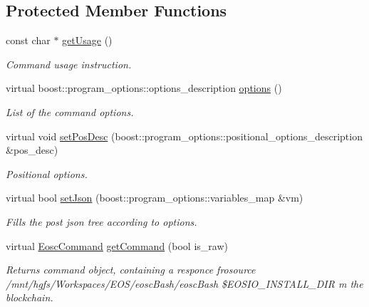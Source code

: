 \subsection*{Protected Member Functions}
\begin{DoxyCompactItemize}
\item 
const char $\ast$ \hyperlink{classtokenika_1_1eosc_1_1_get_block_options_ab0b7572223d35a3232630b9eef51b9cb}{get\+Usage} ()
\begin{DoxyCompactList}\small\item\em Command \textquotesingle{}usage\textquotesingle{} instruction. \end{DoxyCompactList}\item 
virtual boost\+::program\+\_\+options\+::options\+\_\+description \hyperlink{classtokenika_1_1eosc_1_1_get_block_options_a6e8c1a240e5a529c093e0053f12e9ee5}{options} ()
\begin{DoxyCompactList}\small\item\em List of the command options. \end{DoxyCompactList}\item 
virtual void \hyperlink{classtokenika_1_1eosc_1_1_get_block_options_ac6f55ff885c6a553a16ee0b09a0d9da1}{set\+Pos\+Desc} (boost\+::program\+\_\+options\+::positional\+\_\+options\+\_\+description \&pos\+\_\+desc)
\begin{DoxyCompactList}\small\item\em Positional options. \end{DoxyCompactList}\item 
virtual bool \hyperlink{classtokenika_1_1eosc_1_1_get_block_options_a71450327dcf082d00f4c3e3b5c43e619}{set\+Json} (boost\+::program\+\_\+options\+::variables\+\_\+map \&vm)
\begin{DoxyCompactList}\small\item\em Fills the post json tree according to options. \end{DoxyCompactList}\item 
virtual \hyperlink{classtokenika_1_1eosc_1_1_eosc_command}{Eosc\+Command} \hyperlink{classtokenika_1_1eosc_1_1_get_block_options_ac1c5b62f162c4253cab8de5a93fe5cf9}{get\+Command} (bool is\+\_\+raw)
\begin{DoxyCompactList}\small\item\em Returns command object, containing a responce frosource /mnt/hgfs/\+Workspaces/\+E\+O\+S/eosc\+Bash/eosc\+Bash \$\+E\+O\+S\+I\+O\+\_\+\+I\+N\+S\+T\+A\+L\+L\+\_\+\+D\+IR m the blockchain. \end{DoxyCompactList}\item 

\end{DoxyCompactItemize}
